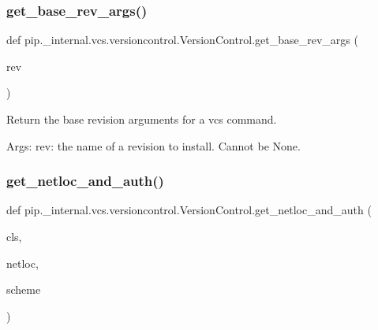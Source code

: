 \subsubsection{\texorpdfstring{get\+\_\+base\+\_\+rev\+\_\+args()}{get\_base\_rev\_args()}}
{\footnotesize\ttfamily def pip.\+\_\+internal.\+vcs.\+versioncontrol.\+Version\+Control.\+get\+\_\+base\+\_\+rev\+\_\+args (\begin{DoxyParamCaption}\item[{}]{rev }\end{DoxyParamCaption})\hspace{0.3cm}{\ttfamily [static]}}

\begin{DoxyVerb}Return the base revision arguments for a vcs command.

Args:
  rev: the name of a revision to install.  Cannot be None.
\end{DoxyVerb}
 \mbox{\label{classpip_1_1__internal_1_1vcs_1_1versioncontrol_1_1VersionControl_a74908511db23ef2cd1e06fbb5743737a}} 
\subsubsection{\texorpdfstring{get\+\_\+netloc\+\_\+and\+\_\+auth()}{get\_netloc\_and\_auth()}}
{\footnotesize\ttfamily def pip.\+\_\+internal.\+vcs.\+versioncontrol.\+Version\+Control.\+get\+\_\+netloc\+\_\+and\+\_\+auth (\begin{DoxyParamCaption}\item[{}]{cls,  }\item[{}]{netloc,  }\item[{}]{scheme }\end{DoxyParamCaption})}

